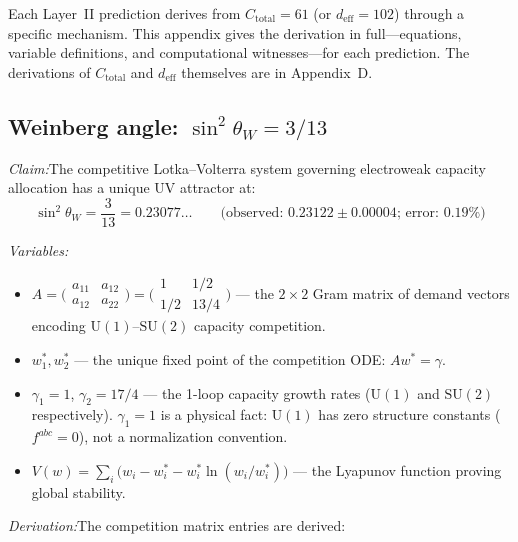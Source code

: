 \documentclass[11pt]{article}
\newcommand{\Ctot}{C_{\mathrm{total}}}
\newcommand{\deff}{d_{\mathrm{eff}}}
\newcommand{\sw}{\sin^2\!\theta_W}
\newcommand{\SU}{\mathrm{SU}}
\newcommand{\U}{\mathrm{U}}
\begin{document}
Each Layer~II prediction derives from $\Ctot = 61$ (or $\deff = 102$) through a specific mechanism.  This appendix gives the derivation in full---equations, variable definitions, and computational witnesses---for each prediction.  The derivations of $\Ctot$ and $\deff$ themselves are in Appendix~D.

\subsection{Weinberg angle: \texorpdfstring{$\sin^2\!\theta_W = 3/13$}{sin²θW = 3/13}}

\begin{tcolorbox}[apfbox, title={T21b: Lyapunov Stability of the Weak Mixing Angle}]
\textit{Claim:}\quad The competitive Lotka--Volterra system governing electroweak capacity allocation has a unique UV attractor at:
\begin{equation}
\sw = \frac{3}{13} = 0.23077\ldots \qquad\text{(observed: } 0.23122 \pm 0.00004\text{; error: 0.19\%)}
\end{equation}

\smallskip\noindent\textit{Variables:}
\begin{itemize}[nosep,leftmargin=2em]
\item $A = \bigl(\begin{smallmatrix} a_{11} & a_{12} \\ a_{12} & a_{22} \end{smallmatrix}\bigr) = \bigl(\begin{smallmatrix} 1 & 1/2 \\ 1/2 & 13/4 \end{smallmatrix}\bigr)$ --- the $2 \times 2$ Gram matrix of demand vectors encoding $\U(1)$--$\SU(2)$ capacity competition.
\item $w_1^*, w_2^*$ --- the unique fixed point of the competition ODE: $Aw^* = \gamma$.
\item $\gamma_1 = 1$, $\gamma_2 = 17/4$ --- the 1-loop capacity growth rates ($\U(1)$ and $\SU(2)$ respectively).  $\gamma_1 = 1$ is a physical fact: $\U(1)$ has zero structure constants ($f^{abc} = 0$), not a normalization convention.
\item $V(w) = \sum_i \bigl(w_i - w_i^* - w_i^* \ln(w_i/w_i^*)\bigr)$ --- the Lyapunov function proving global stability.
\end{itemize}
\end{tcolorbox}

\textit{Derivation:}\quad The competition matrix entries are derived:
\end{document}
